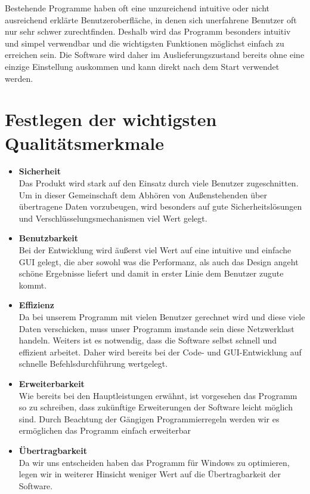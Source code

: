 \documentclass[a4paper,12pt]{scrreprt}
\begin{document}
	Bestehende Programme haben oft eine unzureichend intuitive oder nicht ausreichend erklärte Benutzeroberfläche, in denen sich unerfahrene Benutzer oft nur sehr schwer zurechtfinden. Deshalb wird das Programm besonders intuitiv und simpel verwendbar und die wichtigsten Funktionen möglichst einfach zu erreichen sein. Die Software wird daher im Auslieferungszustand bereits ohne eine einzige Einstellung auskommen und kann direkt nach dem Start  verwendet werden.
	
	
		
	\section{Festlegen der wichtigsten Qualit\"atsmerkmale}
		\begin{itemize}
			\item {\LARGE\textbf{Sicherheit}}\\
		Das Produkt wird stark auf den Einsatz durch viele Benutzer zugeschnitten. Um in dieser Gemeinschaft dem Abhören von Außenstehenden über übertragene Daten vorzubeugen, wird besonders auf gute Sicherheitslösungen und Verschlüsselungsmechanismen viel Wert gelegt. 
			\item {\LARGE\textbf{Benutzbarkeit}}\\
			Bei der Entwicklung wird äußerst viel Wert auf eine intuitive und einfache GUI gelegt, die aber sowohl was die Performanz, als auch das Design angeht schöne Ergebnisse liefert und damit in erster Linie dem Benutzer zugute kommt. 
			
			\item {\LARGE\textbf{Effizienz}}\\
		Da bei unserem Programm  mit vielen Benutzer gerechnet wird und diese  viele Daten verschicken, muss unser Programm  imstande sein diese Netzwerklast handeln. Weiters ist es notwendig, dass die Software selbst schnell und effizient arbeitet. Daher wird bereits bei der Code- und GUI-Entwicklung auf schnelle Befehlsdurchführung wertgelegt.
		
		
			\item {\LARGE\textbf{Erweiterbarkeit}}\\
		Wie bereits bei den Hauptleistungen erwähnt, ist vorgesehen das Programm so zu schreiben, dass zukünftige Erweiterungen der Software leicht möglich sind. Durch Beachtung der Gängigen Programmierregeln werden wir es ermöglichen das Programm einfach erweiterbar 
		
			\item {\LARGE\textbf{Übertragbarkeit}}	\\
			Da wir uns entscheiden haben das Programm für Windows zu optimieren, legen wir in weiterer Hinsicht weniger Wert auf die Übertragbarkeit der Software.
			
			\end{itemize}
\end{document}
